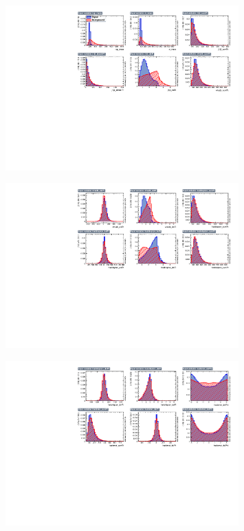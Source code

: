 			\begin{figure}[H]
			\centering{}
    			\includegraphics[width=0.8\textwidth]{Figures/EventSelReco/mva/a05_VarSep1.pdf}\\
			\end{figure}
			\FloatBarrier
			\begin{figure}[H]
			\centering{}
    			\includegraphics[width=0.8\textwidth]{Figures/EventSelReco/mva/a05_VarSep2.pdf}\\
			\end{figure}
			\FloatBarrier
			\begin{figure}[H]
			\centering{}
    			\includegraphics[width=0.8\textwidth]{Figures/EventSelReco/mva/a05_VarSep3.pdf}\\
			\end{figure}
